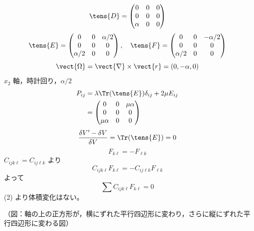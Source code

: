 \[ \tens{D}=\begin{pmatrix}0&0&0\\0&0&0\\\alpha&0&0\end{pmatrix} \]
\[ \tens{E}=\begin{pmatrix}0&0&\alpha/2\\0&0&0\\\alpha/2&0&0\end{pmatrix},\quad \tens{F}=\begin{pmatrix}0&0&-\alpha/2\\0&0&0\\\alpha/2&0&0\end{pmatrix} \]
\[ \vect{\Omega}=\vect{\nabla}\times\vect{r}=(0,-\alpha,0) \]
$x_{2}$ 軸，時計回り，$\alpha/2$
\begin{align*}
P_{ij}&=\lambda\Tr(\tens{E})\delta_{ij}+2\mu E_{ij}\\
&=\begin{pmatrix}0&0&\mu\alpha\\0&0&0\\\mu\alpha&0&0\end{pmatrix}
\end{align*}
\[ \frac{\delta V'-\delta V}{\delta V}=\Tr(\tens{E})=0 \]
\[ F_{k\ell}=-F_{\ell k} \]
$C_{ijk\ell}=C_{ij\ell k}$ より
\[ C_{ijk\ell}F_{k\ell}=-C_{ij\ell k}F_{\ell k} \]
よって
\[ \sum C_{ijk\ell}F_{k\ell}=0 \]
(2) より体積変化はない。

（図：軸の上の正方形が，横にずれた平行四辺形に変わり，さらに縦にずれた平行四辺形に変わる図）

